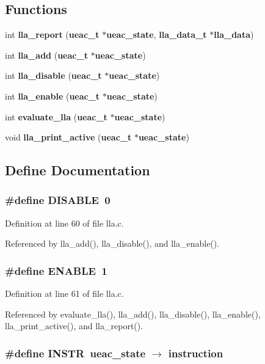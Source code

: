 \subsection*{Functions}
\begin{CompactItemize}
\item 
int {\bf lla\_\-report} ({\bf ueac\_\-t} $\ast${\bf ueac\_\-state}, {\bf lla\_\-data\_\-t} $\ast${\bf lla\_\-data})
\item 
int {\bf lla\_\-add} ({\bf ueac\_\-t} $\ast${\bf ueac\_\-state})
\item 
int {\bf lla\_\-disable} ({\bf ueac\_\-t} $\ast${\bf ueac\_\-state})
\item 
int {\bf lla\_\-enable} ({\bf ueac\_\-t} $\ast${\bf ueac\_\-state})
\item 
int {\bf evaluate\_\-lla} ({\bf ueac\_\-t} $\ast${\bf ueac\_\-state})
\item 
void {\bf lla\_\-print\_\-active} ({\bf ueac\_\-t} $\ast${\bf ueac\_\-state})
\end{CompactItemize}


\subsection{Define Documentation}
\subsubsection{\setlength{\rightskip}{0pt plus 5cm}\#define DISABLE~0}\label{lla_8c_a2}




Definition at line 60 of file lla.c.

Referenced by lla\_\-add(), lla\_\-disable(), and lla\_\-enable().
\subsubsection{\setlength{\rightskip}{0pt plus 5cm}\#define ENABLE~1}\label{lla_8c_a3}




Definition at line 61 of file lla.c.

Referenced by evaluate\_\-lla(), lla\_\-add(), lla\_\-disable(), lla\_\-enable(), lla\_\-print\_\-active(), and lla\_\-report().
\subsubsection{\setlength{\rightskip}{0pt plus 5cm}\#define INSTR~{\bf ueac\_\-state} $\rightarrow$ instruction}\label{lla_8c_a0}




